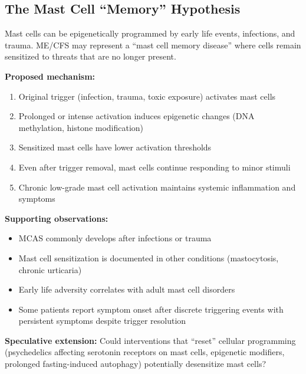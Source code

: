 \subsection{The Mast Cell ``Memory'' Hypothesis}
\label{sec:mast-cell-memory}

\begin{hypothesis}
\label{hyp:mast-memory}
Mast cells can be epigenetically programmed by early life events, infections, and trauma. ME/CFS may represent a ``mast cell memory disease'' where cells remain sensitized to threats that are no longer present.

\textbf{Proposed mechanism:}
\begin{enumerate}
    \item Original trigger (infection, trauma, toxic exposure) activates mast cells
    \item Prolonged or intense activation induces epigenetic changes (DNA methylation, histone modification)
    \item Sensitized mast cells have lower activation thresholds
    \item Even after trigger removal, mast cells continue responding to minor stimuli
    \item Chronic low-grade mast cell activation maintains systemic inflammation and symptoms
\end{enumerate}

\textbf{Supporting observations:}
\begin{itemize}
    \item MCAS commonly develops after infections or trauma
    \item Mast cell sensitization is documented in other conditions (mastocytosis, chronic urticaria)
    \item Early life adversity correlates with adult mast cell disorders
    \item Some patients report symptom onset after discrete triggering events with persistent symptoms despite trigger resolution
\end{itemize}

\textbf{Speculative extension:} Could interventions that ``reset'' cellular programming (psychedelics affecting serotonin receptors on mast cells, epigenetic modifiers, prolonged fasting-induced autophagy) potentially desensitize mast cells?
\end{hypothesis}

